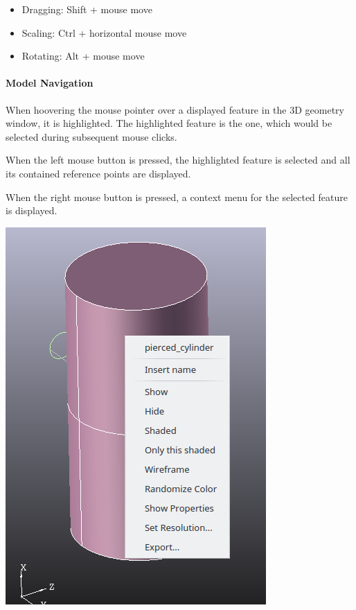 \begin{itemize}
\item Dragging: Shift + mouse move
\item Scaling: Ctrl + horizontal mouse move
\item Rotating: Alt + mouse move
\end{itemize}


\paragraph{Model Navigation}

When hoovering the mouse pointer over a displayed feature in the 3D
geometry window, it is highlighted. The highlighted feature is the one,
which would be selected during subsequent mouse clicks.

When the left mouse button is pressed, the highlighted feature is
selected and all its contained reference points are displayed.

When the right mouse button is pressed, a context menu for the selected
feature is displayed.

\includegraphics[width=\linewidth]{figs/iscad/screen_iscad_contextmenu_3d}

